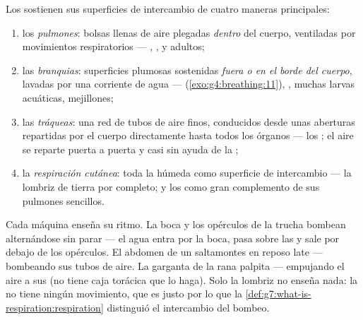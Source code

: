 \begin{definition}\label{def:g7:how-animals-breathe:four}
Los  sostienen sus superficies de intercambio de cuatro maneras
principales:
\begin{enumerate}
  \item los \emph{pulmones}: bolsas llenas de aire
        plegadas \emph{dentro} del cuerpo, ventiladas por movimientos
        respiratorios --- , ,  y  adultos;
  \item las \emph{branquias}: superficies plumosas
        sostenidas \emph{fuera o en el borde del cuerpo}, lavadas por
        una corriente de agua --- 
        (\cref{exo:g4:breathing:11}), , muchas larvas
        acuáticas, mejillones;
  \item las \emph{tráqueas}: una red de tubos
        de aire finos, conducidos desde unas aberturas repartidas por
        el cuerpo directamente hasta todos los órganos --- los
        ; el aire se reparte puerta a puerta y casi sin ayuda
        de la ;
  \item la \emph{respiración cutánea}: toda
        la  húmeda como superficie de intercambio --- la lombriz de
        tierra por completo; y los  como gran complemento de
        sus pulmones sencillos.
\end{enumerate}
\end{definition}

\begin{example}\label{ex:g7:how-animals-breathe:watch}
Cada máquina enseña su ritmo. La boca y los opérculos de la trucha
bombean alternándose sin parar --- el agua entra por la boca, pasa
sobre las  y sale por debajo de los opérculos. El abdomen de
un saltamontes en reposo late --- bombeando sus tubos de aire. La
garganta de la rana palpita --- empujando el aire a sus  (no
tiene caja torácica que lo haga). Solo la lombriz no enseña nada: la
 no tiene ningún movimiento, que es justo por lo que
la \cref{def:g7:what-is-respiration:respiration} distinguió el
intercambio del bombeo.
\end{example}

